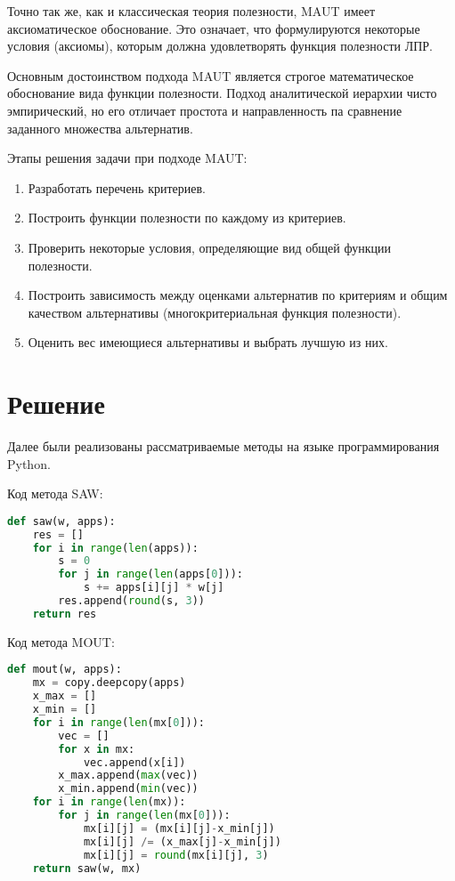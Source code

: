 Точно так же, как и классическая теория полезности, MAUT имеет
аксиоматическое обоснование. Это означает, что формулируются
некоторые условия (аксиомы), которым должна удовлетворять функция
полезности ЛПР.\par
Основным достоинством подхода MAUT является строгое математическое
обоснование вида функции полезности. Подход аналитической иерархии чисто
эмпирический, но его отличает простота и направленность па сравнение
заданного множества альтернатив.

Этапы решения задачи при подходе MAUT:
\begin{enumerate}
	\item Разработать перечень критериев.
	\item Построить функции полезности по каждому из критериев.
	\item Проверить некоторые условия, определяющие вид общей
		функции полезности.
	\item Построить зависимость между оценками альтернатив
		по критериям и общим качеством альтернативы
		(многокритериальная функция полезности).
	\item Оценить вес имеющиеся альтернативы и выбрать лучшую из них.
\end{enumerate}

\section{Решение}
Далее были реализованы рассматриваемые методы на языке программирования
Python.

Код метода SAW:
\begin{lstlisting}[language=Python]
def saw(w, apps):
	res = []
	for i in range(len(apps)):
		s = 0
		for j in range(len(apps[0])):
			s += apps[i][j] * w[j]
		res.append(round(s, 3))
	return res
\end{lstlisting}

Код метода MOUT:
\begin{lstlisting}[language=Python]
def mout(w, apps):
	mx = copy.deepcopy(apps)
	x_max = []
	x_min = []
	for i in range(len(mx[0])):
		vec = []
		for x in mx:
			vec.append(x[i])
		x_max.append(max(vec))
		x_min.append(min(vec))
	for i in range(len(mx)):
		for j in range(len(mx[0])):
			mx[i][j] = (mx[i][j]-x_min[j])
			mx[i][j] /= (x_max[j]-x_min[j])
			mx[i][j] = round(mx[i][j], 3)
	return saw(w, mx)
\end{lstlisting}

